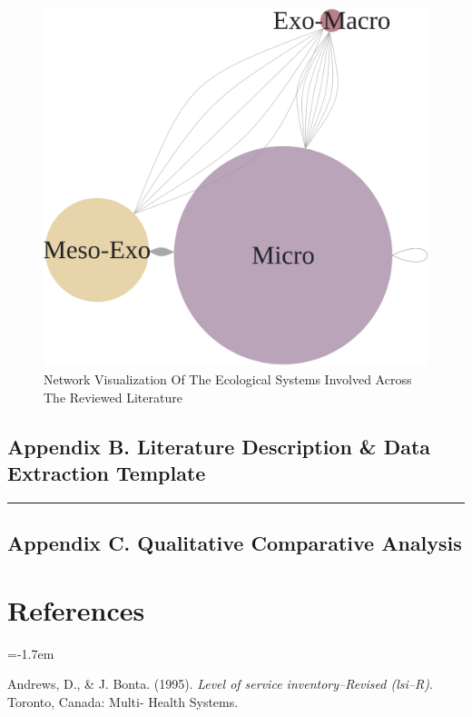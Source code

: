 \documentclass[11pt,]{tufte-book}
\newcommand{\Frule}{
    \vspace*{-1em}
    \begin{fullwidth}\textcolor{blublk}{\rule{\linewidth}{0.2mm}}\end{fullwidth}
}
\newcommand{\refs}{
    \parindent=-1.7em\
    \
    \setlength{\parskip}{0.5\baselineskip}
}
\begin{document}
\begin{figure}
\centering
\includegraphics{graphics/inputs/sysnet.png}
\caption{Network Visualization Of The Ecological Systems Involved Across
The Reviewed Literature\label{fig:sysnet}}
\end{figure}

\newpage

\chapter{Appendix B. Literature Description \& Data Extraction
Template}\label{appendix-b.-literature-description-data-extraction-template}

\Frule

\chapter{Appendix C. Qualitative Comparative
Analysis}\label{appendix-c.-qualitative-comparative-analysis}

\part{References}

\refs

\hypertarget{refs}{}
\hypertarget{ref-andrews1994level}{}
Andrews, D., \& J. Bonta. (1995). \emph{Level of service
inventory--Revised (lsi--R)}. Toronto, Canada: Multi- Health Systems.
\end{document}
